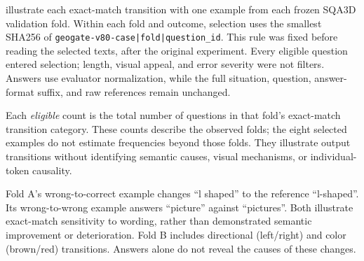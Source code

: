 \label{sec:supp_answer_cases}

 illustrate each exact-match transition with one example from each frozen SQA3D validation fold. Within each fold and outcome, selection uses the smallest SHA256 of \texttt{geogate-v80-case|fold|question\_id}. This rule was fixed before reading the selected texts, after the original experiment. Every eligible question entered selection; length, visual appeal, and error severity were not filters. Answers use evaluator normalization, while the full situation, question, answer-format suffix, and raw references remain unchanged.

Each \emph{eligible} count is the total number of questions in that fold's exact-match transition category. These counts describe the observed folds; the eight selected examples do not estimate frequencies beyond those folds. They illustrate output transitions without identifying semantic causes, visual mechanisms, or individual-token causality.

Fold A's wrong-to-correct example changes ``l shaped'' to the reference ``l-shaped''. Its wrong-to-wrong example answers ``picture'' against ``pictures''. Both illustrate exact-match sensitivity to wording, rather than demonstrated semantic improvement or deterioration. Fold B includes directional (left/right) and color (brown/red) transitions. Answers alone do not reveal the causes of these changes.

